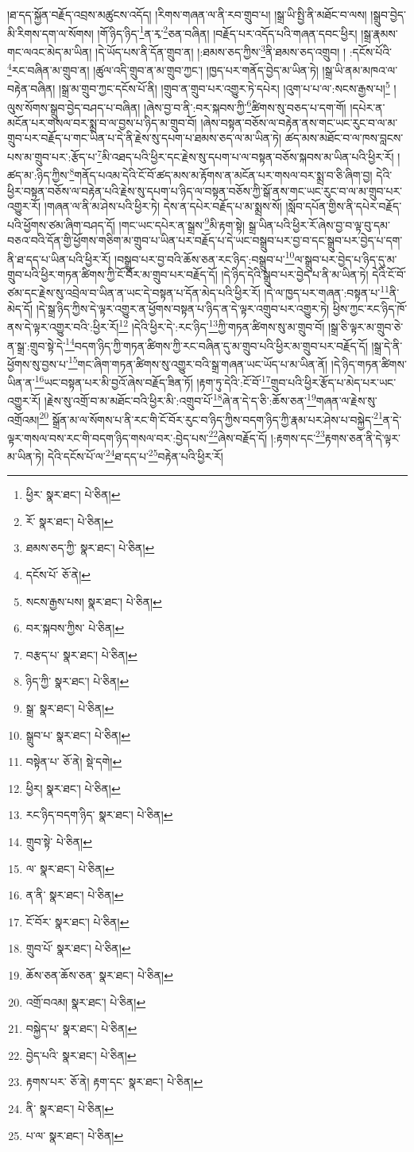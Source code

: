 །ཐ་དད་སྐྱོན་བརྗོད་འབྲས་མཚུངས་འདོད། །རིགས་གཞན་ལ་ནི་རབ་གྲུབ་པ། །སྒྲ་ཡི་སྤྱི་ནི་མཐོང་བ་ལས། །སྒྲུབ་བྱེད་མི་རིགས་དག་ལ་སོགས། །གོ་ཉིད་ཉིད་\footnote{ཕྱིར་  སྣར་ཐང་།  པེ་ཅིན། }ན་རྭ་\footnote{རོ་  སྣར་ཐང་།  པེ་ཅིན། }ཅན་བཞིན། །བརྗོད་པར་འདོད་པའི་གཞན་དབང་ཕྱིར། །སྒྲ་རྣམས་གང་ལའང་མེད་མ་ཡིན། །དེ་ཡོད་པས་ནི་དོན་གྲུབ་ན། །:ཐམས་ཅད་ཀྱིས་\footnote{ཐམས་ཅད་ཀྱི་  སྣར་ཐང་།  པེ་ཅིན། }ནི་ཐམས་ཅད་འགྲུབ། །
:དངོས་པོའི་\footnote{དངོས་པོ་  ཅོ་ནེ། }རང་བཞིན་མ་གྲུབ་ན། །ཚུལ་འདི་གྲུབ་ན་མ་གྲུབ་ཀྱང་། །ཁྱད་པར་གནོད་བྱེད་མ་ཡིན་ཏེ། །སྒྲ་ཡི་ནམ་མཁའ་ལ་བརྟེན་བཞིན། །སྒྲ་མ་གྲུབ་ཀྱང་དངོས་པོ་ནི། །གྲུབ་ན་གྲུབ་པར་འགྱུར་ཏེ་དཔེར། །འུག་པ་པ་ལ་:སངས་རྒྱས་པ།\footnote{སངས་རྒྱས་པས།  སྣར་ཐང་།  པེ་ཅིན། } །ལུས་སོགས་སྒྲུབ་བྱེད་བཤད་པ་བཞིན། །ཞེས་བྱ་བ་ནི་:བར་སྐབས་ཀྱི་\footnote{བར་སྐབས་ཀྱིས་  པེ་ཅིན། }ཚིགས་སུ་བཅད་པ་དག་གོ། །དཔེར་ན་མངོན་པར་གསལ་བར་སྨྲ་བ་ལ་བྱས་པ་ཉིད་མ་གྲུབ་བོ། །ཞེས་བསྟན་བཅོས་ལ་བརྟེན་ནས་གང་ཡང་རུང་བ་ལ་མ་གྲུབ་པར་བརྗོད་པ་གང་ཡིན་པ་དེ་ནི་རྗེས་སུ་དཔག་པ་ཐམས་ཅད་ལ་མ་ཡིན་ཏེ། ཚད་མས་མཐོང་བ་ལ་ཁས་བླངས་པས་མ་གྲུབ་པར་:རྩོད་པ་\footnote{བརྩད་པ་  སྣར་ཐང་།  པེ་ཅིན། }མི་འཐད་པའི་ཕྱིར་དང་རྗེས་སུ་དཔག་པ་ལ་བསྟན་བཅོས་སྐབས་མ་ཡིན་པའི་ཕྱིར་རོ། །ཚད་མ་:ཉིད་ཀྱིས་\footnote{ཉིད་ཀྱི་  སྣར་ཐང་།  པེ་ཅིན། }གནོད་པའམ་དེའི་ངོ་བོ་ཚད་མས་མ་རྟོགས་ན་མངོན་པར་གསལ་བར་སྨྲ་བ་ཅི་ཞིག་བྱ། དེའི་ཕྱིར་བསྟན་བཅོས་ལ་བརྟེན་པའི་རྗེས་སུ་དཔག་པ་ཉིད་ལ་བསྟན་བཅོས་ཀྱི་སྒོ་ནས་གང་ཡང་རུང་བ་ལ་མ་གྲུབ་པར་འགྱུར་རོ། །གཞན་ལ་ནི་མ་ཤེས་པའི་ཕྱིར་ཏེ། དེས་ན་དཔེར་བརྗོད་པ་མ་སྨྲས་སོ། །སློབ་དཔོན་གྱིས་ནི་དཔེར་བརྗོད་པའི་ཕྱོགས་ཙམ་ཞིག་བཤད་དོ། །གང་ཡང་དཔེར་ན་སྒྲས་\footnote{སྒྲ་  སྣར་ཐང་།  པེ་ཅིན། }མི་རྟག་སྟེ། སྒྲ་ཡིན་པའི་ཕྱིར་རོ་ཞེས་བྱ་བ་ལྟ་བུ་དམ་བཅའ་བའི་དོན་གྱི་ཕྱོགས་གཅིག་མ་གྲུབ་པ་ཡིན་པར་བརྗོད་པ་དེ་ཡང་བསྒྲུབ་པར་བྱ་བ་དང་སྒྲུབ་པར་བྱེད་པ་དག་ནི་ཐ་དད་པ་ཡིན་པའི་ཕྱིར་རོ། །བསྒྲུབ་པར་བྱ་བའི་ཆོས་ཅན་རང་ཉིད་:བསྒྲུབ་པ་\footnote{སྒྲུབ་པ་  སྣར་ཐང་།  པེ་ཅིན། }ལ་སྒྲུབ་པར་བྱེད་པ་ཉིད་དུ་མ་གྲུབ་པའི་ཕྱིར་གཏན་ཚིགས་ཀྱི་ངོ་བོར་མ་གྲུབ་པར་བརྗོད་དོ། །དེ་ཉིད་དེའི་སྒྲུབ་པར་བྱེད་པ་ནི་མ་ཡིན་ཏེ། དེའི་ངོ་བོ་ཙམ་དང་རྗེས་སུ་འབྲེལ་བ་ཡིན་ན་ཡང་དེ་བསྟན་པ་དོན་མེད་པའི་ཕྱིར་རོ། །དེ་ལ་ཁྱད་པར་གཞན་:བསྟན་པ་\footnote{བསྟེན་པ་  ཅོ་ནེ།  སྡེ་དགེ། }ནི་མེད་དོ། །དེ་སྒྲ་ཉིད་ཀྱིས་དེ་ལྟར་འགྱུར་ན་ཕྱོགས་བསྟན་པ་ཉིད་ན་དེ་ལྟར་འགྲུབ་པར་འགྱུར་ཏེ། ཕྱིས་ཀྱང་རང་ཉིད་ཁོ་ནས་དེ་ལྟར་འགྱུར་བའི་:ཕྱིར་རོ།\footnote{ཕྱིར།  སྣར་ཐང་།  པེ་ཅིན། } །དེའི་ཕྱིར་དེ་:རང་ཉིད་\footnote{རང་ཉིད་བདག་ཉིད་  སྣར་ཐང་།  པེ་ཅིན། }ཀྱི་གཏན་ཚིགས་སུ་མ་གྲུབ་བོ། །སྒྲ་ཅི་ལྟར་མ་གྲུབ་ཅེ་ན་སྒྲ་:གྲུབ་སྟེ་དེ་\footnote{གྲུབ་སྟེ་  པེ་ཅིན། }བདག་ཉིད་ཀྱི་གཏན་ཚིགས་ཀྱི་རང་བཞིན་དུ་མ་གྲུབ་པའི་ཕྱིར་མ་གྲུབ་པར་བརྗོད་དོ། །སྒྲ་དེ་ནི་ཕྱོགས་སུ་བྱས་པ་\footnote{ལ་  སྣར་ཐང་།  པེ་ཅིན། }གང་ཞིག་གཏན་ཚིགས་སུ་འགྱུར་བའི་སྒྲ་གཞན་ཡང་ཡོད་པ་མ་ཡིན་ནོ། །དེ་ཉིད་གཏན་ཚིགས་ཡིན་ན་\footnote{ན་ནི་  སྣར་ཐང་།  པེ་ཅིན། }ཡང་བསྟན་པར་མི་བྱའོ་ཞེས་བརྗོད་ཟིན་ཏོ། །རྟག་ཏུ་དེའི་:ངོ་བོ་\footnote{ངོ་བོར་  སྣར་ཐང་།  པེ་ཅིན། }གྲུབ་པའི་ཕྱིར་རྩོད་པ་མེད་པར་ཡང་འགྱུར་རོ། །རྗེས་སུ་འགྲོ་བ་མ་མཐོང་བའི་ཕྱིར་མི་:འགྲུབ་པོ་\footnote{གྲུབ་པོ་  སྣར་ཐང་།  པེ་ཅིན། }ཞེ་ན་དེ་ད་ཅི་:ཆོས་ཅན་\footnote{ཆོས་ཅན་ཆོས་ཅན་  སྣར་ཐང་།  པེ་ཅིན། }གཞན་ལ་རྗེས་སུ་འགྲོའམ།\footnote{འགྲོ་བའམ།  སྣར་ཐང་།  པེ་ཅིན། } སྒྲོན་མ་ལ་སོགས་པ་ནི་རང་གི་ངོ་བོར་རུང་བ་ཉིད་ཀྱིས་བདག་ཉིད་ཀྱི་རྣམ་པར་ཤེས་པ་བསྐྱེད་\footnote{བསྐྱེད་པ་  སྣར་ཐང་།  པེ་ཅིན། }ན་དེ་ལྟར་གསལ་བས་རང་གི་བདག་ཉིད་གསལ་བར་:བྱེད་པས་\footnote{བྱེད་པའི་  སྣར་ཐང་།  པེ་ཅིན། }ཞེས་བརྗོད་དོ། །:རྟགས་དང་\footnote{རྟགས་པར་  ཅོ་ནེ། རྟག་དང་  སྣར་ཐང་།  པེ་ཅིན། }རྟགས་ཅན་ནི་དེ་ལྟར་མ་ཡིན་ཏེ། དེའི་དངོས་པོ་ལ་\footnote{ནི་  སྣར་ཐང་།  པེ་ཅིན། }ཐ་དད་པ་\footnote{པ་ལ་  སྣར་ཐང་།  པེ་ཅིན། }བརྟེན་པའི་ཕྱིར་རོ། 